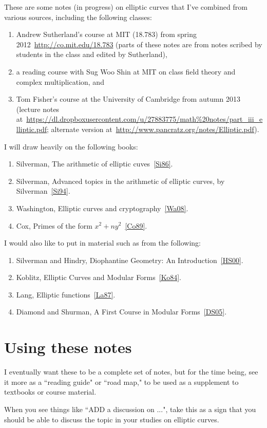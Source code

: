 These are some notes (in progress) on elliptic curves that I've combined from various sources, including the following classes:
\begin{enumerate}
\item
Andrew Sutherland's course at MIT (18.783) from spring 2012~\url{http://co.mit.edu/18.783} (parts of these notes are from notes scribed by students in the class and edited by Sutherland),
\item
a reading course with Sug Woo Shin at MIT on class field theory and complex multiplication, and
\item
Tom Fisher's course at the University of Cambridge from autumn 2013 (lecture notes at~\url{https://dl.dropboxusercontent.com/u/27883775/math\%20notes/part_iii_elliptic.pdf}; alternate version at~\url{http://www.pancratz.org/notes/Elliptic.pdf}).
\end{enumerate}
I will draw heavily on the following books:
\begin{enumerate}
\item
Silverman, The arithmetic of elliptic cuves~\ref{Si86}.
\item 
Silverman, Advanced topics in the arithmetic of elliptic curves, by Silverman~\ref{Si94}.
\item
Washington, Elliptic curves and cryptography~\ref{Wa08}.
\item
Cox, Primes of the form $x^2+ny^2$~\ref{Co89}.
\end{enumerate}
I would also like to put in material such as from the following:
\begin{enumerate}
\item
Silverman and Hindry, Diophantine Geometry: An Introduction~\ref{HS00}.
\item
Koblitz, Elliptic Curves and Modular Forms~\ref{Ko84}.
\item
Lang, Elliptic functions~\ref{La87}.
\item 
Diamond and Shurman, A First Course in Modular Forms~\ref{DS05}.
\end{enumerate}

\section*{Using these notes}
I eventually want these to be a complete set of notes, but for the time being, see it more as a ``reading guide" or ``road map," to be used as a supplement to textbooks or course material.

When you see things like ``ADD a discussion on ...", take this as a sign that you should be able to discuss the topic in your studies on elliptic curves.

